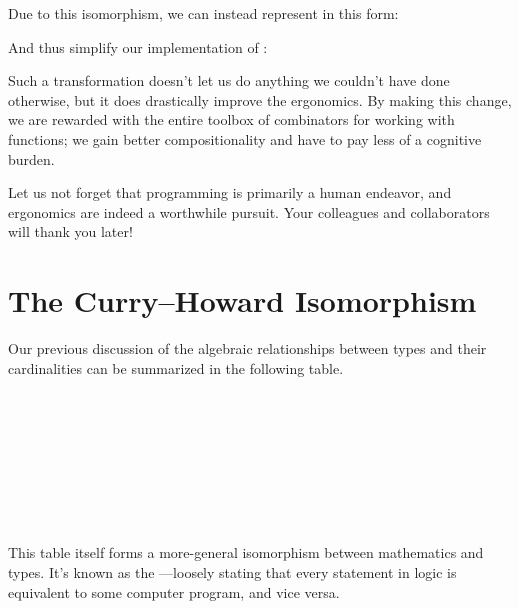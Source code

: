 \documentclass[book.tex]{subfiles}
\begin{document}

Due to this isomorphism, we can instead represent  in this form:


And thus simplify our implementation of :


Such a transformation doesn't let us do anything we couldn't have done
otherwise, but it does drastically improve the ergonomics. By making this
change, we are rewarded with the entire toolbox of combinators for working with
functions; we gain better compositionality and have to pay less of a cognitive
burden.

Let us not forget that programming is primarily a human endeavor, and ergonomics
are indeed a worthwhile pursuit. Your colleagues and collaborators will thank
you later!


\section{The Curry--Howard Isomorphism}

Our previous discussion of the algebraic relationships between types and their
cardinalities can be summarized in the following table.

\spaceMyBox
\begin{myTable}
\hline
   \\ \hline
   \\ \hline
   \\ \hline
   \\ \hline
   \\ \hline
   \\ \hline
   \\ \hline
\end{myTable}
\spaceMyBox

This table itself forms a more-general isomorphism between mathematics and
types. It's known as the ---loosely stating
that every statement in logic is equivalent to some computer program, and vice
versa.
\end{document}
